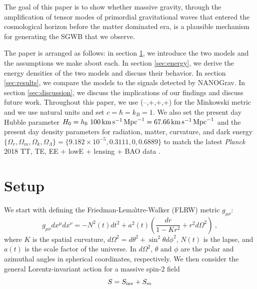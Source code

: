 \documentclass[prd,twocolumn,aps,psfig,nofootinbib,nobibnotes,superscriptaddress,preprintnumbers,times]{revtex4-2}
\newcommand{\s}{\,{\rm s}}
\newcommand{\km}{\,{\rm km}}
\newcommand{\Mpc}{\,{\rm Mpc}}
\newcommand{\inv}{\rm inv}
\begin{document}
The goal of this paper is to show whether massive gravity, through the amplification of tensor modes of primordial gravitational waves that entered the cosmological horizon before the matter dominated era, is a plausible mechanism for generating the SGWB that we observe. 

The paper is arranged as follows: in section \ref{sec:setup}, we introduce the two models and the assumptions we make about each. In section \ref{sec:energy}, we derive the energy densities of the two models and discuss their behavior. In section \ref{sec:results}, we compare the models to the signals detected by NANOGrav. In section \ref{sec:discussion}, we discuss the implications of our findings and discuss future work. Throughout this paper, we use  (--,+,+,+) for the Minkowski metric and we use natural units and set $c = \hbar = k_B = 1$. We also set the present day Hubble parameter $H_0 = h_0\ 100 \km \s^{-1}\Mpc^{-1} = 67.66 \km \s^{-1}\Mpc^{-1}$ and the present day density parameters for radiation, matter, curvature, and dark energy $\{\Omega_r, \Omega_m, \Omega_k, \Omega_\Lambda\} = \{9.182\times10^{-5},0.3111,0,0.6889\}$ to match the latest \textit{Planck} 2018 TT, TE, EE + lowE + lensing + BAO data \cite{Planck:2020}.

\section{Setup}\label{sec:setup}
We start with defining the Friedman-Lema\^{\i}tre-Walker (FLRW) metric $g_{\mu\nu}$:
\begin{equation}\label{eqn:metric}
    g_{\mu\nu}dx^{\mu} dx^{\nu} = -N^2(t)dt^2 +a^2(t)\left(\frac{dr}{1-Kr^2} + r^2 d\Omega^2\right)\ ,
\end{equation}
where $K$ is the spatial curvature, $d\Omega^2 = d\theta^2 + \sin^2\theta d\phi^2$, $N(t)$ is the lapse, and $a(t)$ is the scale factor of the universe. In $d\Omega^2$, $\theta$ and $\phi$ are the polar and azimuthal angles in spherical coordinates, respectively. We then consider the general Lorentz-invariant action for a massive spin-2 field \cite{Blasi:2017}
\begin{equation}\label{eqn:action}
    S = S_{\inv} + S_{m}
\end{equation}
\end{document}

